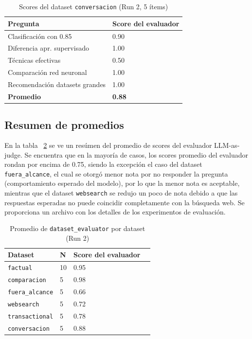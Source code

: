 \documentclass[conference]{IEEEtran}
\begin{document}
\begin{table}[htbp]
\caption{Scores del dataset \texttt{conversacion} (Run 2, 5 ítems)}
\label{tab:conversacion}
\centering
\begin{tabular}{p{3.5cm}p{3.2cm}}
\toprule
\textbf{Pregunta} & \textbf{Score del evaluador} \\
\midrule
Clasificación con 0.85            & 0.90 \\
Diferencia apr. supervisado       & 1.00 \\
Técnicas efectivas                & 0.50 \\
Comparación red neuronal          & 1.00 \\
Recomendación datasets grandes    & 1.00 \\
\midrule
\textbf{Promedio}                 & \textbf{0.88} \\
\bottomrule
\end{tabular}
\end{table}

\subsection{Resumen de promedios}

En la tabla ~\ref{tab:resumen} se ve un resúmen del promedio de scores del evaluador LLM-as-judge. Se encuentra que en la mayoría de casos, los scores promedio del evaluador rondan por encima de 0.75, siendo la excepción el caso del dataset \texttt{fuera\_alcance}, el cual se otorgó menor nota por no responder la pregunta (comportamiento esperado del modelo), por lo que la menor nota es aceptable, mientras que el dataset \texttt{websearch} se redujo un poco de nota debido a que las respuestas esperadas no puede coincidir completamente con la búsqueda web. Se proporciona un archivo con los detalles de los experimentos de evaluación.

\begin{table}[htbp]
\caption{Promedio de \texttt{dataset\_evaluator} por dataset (Run 2)}
\label{tab:resumen}
\centering
\begin{tabular}{p{3cm}p{1.2cm}p{1.2cm}p{1.5cm}}
\toprule
\textbf{Dataset} & \textbf{N} & \textbf{Score del evaluador} \\
\midrule
\texttt{factual}        & 10 & 0.95 \\
\texttt{comparacion}    & 5  & 0.98 \\
\texttt{fuera\_alcance} & 5  & 0.66 \\
\texttt{websearch}      & 5  & 0.72 \\
\texttt{transactional}  & 5  & 0.78  \\
\texttt{conversacion}   & 5  & 0.88  \\
\bottomrule
\end{tabular}
\end{table}
\end{document}
